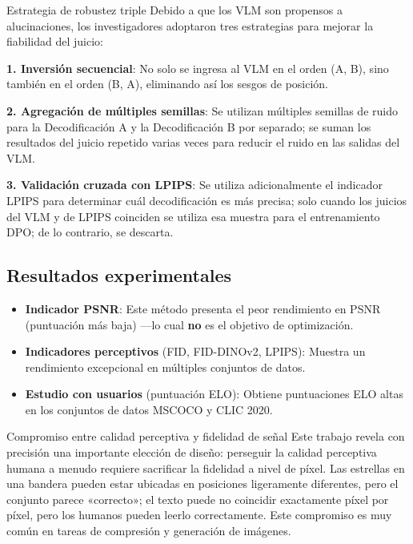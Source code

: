 \documentclass[a4paper]{article}
\begin{document}
\begin{importantbox}{Estrategia de robustez triple}
Debido a que los VLM son propensos a alucinaciones, los investigadores adoptaron tres estrategias para mejorar la fiabilidad del juicio:

\textbf{1. Inversión secuencial}: No solo se ingresa al VLM en el orden (A, B), sino también en el orden (B, A), eliminando así los sesgos de posición.

\textbf{2. Agregación de múltiples semillas}: Se utilizan múltiples semillas de ruido para la Decodificación A y la Decodificación B por separado; se suman los resultados del juicio repetido varias veces para reducir el ruido en las salidas del VLM.

\textbf{3. Validación cruzada con LPIPS}: Se utiliza adicionalmente el indicador LPIPS para determinar cuál decodificación es más precisa; solo cuando los juicios del VLM y de LPIPS coinciden se utiliza esa muestra para el entrenamiento DPO; de lo contrario, se descarta.
\end{importantbox}

\subsection{Resultados experimentales}

\begin{itemize}
    \item \textbf{Indicador PSNR}: Este método presenta el peor rendimiento en PSNR (puntuación más baja) —lo cual \textbf{no} es el objetivo de optimización.
    \item \textbf{Indicadores perceptivos} (FID, FID-DINOv2, LPIPS): Muestra un rendimiento excepcional en múltiples conjuntos de datos.
    \item \textbf{Estudio con usuarios} (puntuación ELO): Obtiene puntuaciones ELO altas en los conjuntos de datos MSCOCO y CLIC 2020.
\end{itemize}

\begin{knowledgebox}{Compromiso entre calidad perceptiva y fidelidad de señal}
Este trabajo revela con precisión una importante elección de diseño: perseguir la calidad perceptiva humana a menudo requiere sacrificar la fidelidad a nivel de píxel. Las estrellas en una bandera pueden estar ubicadas en posiciones ligeramente diferentes, pero el conjunto parece «correcto»; el texto puede no coincidir exactamente píxel por píxel, pero los humanos pueden leerlo correctamente. Este compromiso es muy común en tareas de compresión y generación de imágenes.
\end{knowledgebox}
\end{document}
